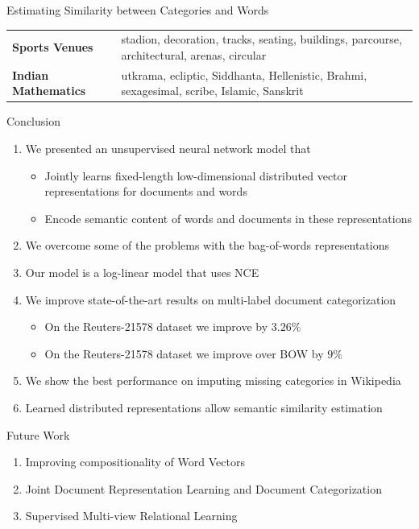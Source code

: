 \documentclass[10pt]{beamer}
\begin{document}
\begin{frame}{Estimating Similarity between Categories and Words }
\begin{table}[h!]
\begin{center}
\begin{tabular}{l@{\hskip3mm} l}
\textbf{Sports Venues}          & stadion, decoration, tracks, seating, buildings, parcourse, architectural, arenas, circular \\
\textbf{Indian Mathematics}     & utkrama, ecliptic, Siddhanta, Hellenistic, Brahmi, sexagesimal, scribe, Islamic, Sanskrit \\
\bottomrule         
\end{tabular}
\end{center}
\end{table}
\end{frame}

\begin{frame}{Conclusion }
\begin{enumerate}
	\vfill\item<1-> We presented an unsupervised neural network model that 
	\begin{itemize}
		\vfill\item Jointly learns fixed-length low-dimensional distributed vector representations for documents and words
		\vfill\item Encode semantic content of words and documents in these representations
	\end{itemize}
	
	\vfill\item<2-> We overcome some of the problems with the bag-of-words representations 
	\vfill\item<3-> Our model is a log-linear model that uses NCE
	\vfill\item<4-> We improve state-of-the-art results on multi-label document categorization
	\begin{itemize}
		\vfill\item On the Reuters-21578 dataset we improve by $3.26\%$
		\vfill\item On the Reuters-21578 dataset we improve over BOW by $9\%$
	\end{itemize}
	\vfill\item<5-> We show the best performance on imputing missing categories in Wikipedia
	\vfill\item<6-> Learned distributed representations allow semantic similarity estimation
\end{enumerate}
\end{frame}

\begin{frame}{Future Work }
\begin{enumerate}
	\item<1-> Improving compositionality of Word Vectors
	\vfill\item<1-> Joint Document Representation Learning and Document Categorization
	\vfill\item<1-> Supervised Multi-view Relational Learning
\end{enumerate}

\end{frame}
\end{document}
